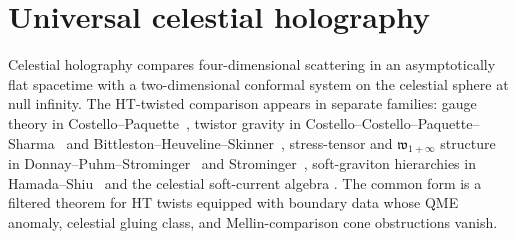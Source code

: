 %
%

\providecommand{\cA}{\mathcal A}
\providecommand{\cB}{\mathcal B}
\providecommand{\cC}{\mathcal C}
\providecommand{\cE}{\mathcal E}
\providecommand{\cF}{\mathcal F}
\providecommand{\cH}{\mathcal H}
\providecommand{\cI}{\mathcal I}
\providecommand{\cL}{\mathcal L}
\providecommand{\cM}{\mathcal M}
\providecommand{\cO}{\mathcal O}
\providecommand{\cP}{\mathcal P}
\providecommand{\cS}{\mathcal S}
\providecommand{\cT}{\mathcal T}
\providecommand{\cW}{\mathcal W}
\providecommand{\RR}{\mathbb R}
\providecommand{\CC}{\mathbb C}
\providecommand{\PP}{\mathbb P}
\providecommand{\ZZ}{\mathbb Z}
\providecommand{\NN}{\mathbb N}
\providecommand{\HH}{\mathbb H}
\providecommand{\scri}{\mathscr I}
\providecommand{\Ran}{\operatorname{Ran}}
\providecommand{\Sym}{\operatorname{Sym}}
\providecommand{\Obs}{\operatorname{Obs}}
\providecommand{\Cone}{\operatorname{Cone}}
\providecommand{\gr}{\operatorname{gr}}
\providecommand{\End}{\operatorname{End}}
\providecommand{\Hom}{\operatorname{Hom}}
\providecommand{\Res}{\operatorname{Res}}
\providecommand{\Mel}{\widetilde}
\providecommand{\SCchtop}{\mathsf{SC}^{\mathrm{ch,top}}}
\providecommand{\Barch}{\mathrm B^{\mathrm{ch}}}
\providecommand{\BarchOrd}{\mathrm B^{\mathrm{ch},\mathrm{ord}}}
\providecommand{\ChirHoch}{\mathrm{ChirHoch}}
\providecommand{\dlog}{\mathrm d\log}
\providecommand{\delbar}{\bar\partial}
\providecommand{\vf}{\boldsymbol\eta}
\providecommand{\wtc}{\mathfrak w_{1+\infty}}
\providecommand{\kap}{\kappaChHodge}

\section{Universal celestial holography}
\label{sec:universal-celestial-holography}

\noindent
Celestial holography compares four-dimensional scattering in an
asymptotically flat spacetime with a two-dimensional conformal system
on the celestial sphere at null infinity. The HT-twisted comparison
appears in separate families: gauge theory in
Costello--Paquette~\cite{CostelloPaquetteTwistedSugraStates,
CostelloPaquetteIIBTwist}, twistor gravity in
Costello--Costello--Paquette--Sharma~\cite{CostelloPaquetteSharmaCelestial}
and Bittleston--Heuveline--Skinner~\cite{BittlestonHeuvelineSkinner},
stress-tensor and $\wtc$ structure in
Donnay--Puhm--Strominger~\cite{DonnayPuhmStrominger18} and
Strominger~\cite{StromingerWInfinityCelestial}, soft-graviton hierarchies
in Hamada--Shiu~\cite{HamadaShiuSubsubSoft} and the celestial
soft-current algebra
\cite{GuevaraHimwichPateStrominger21,StromingerWInfinityCelestial}.
The common form is a
filtered theorem for HT twists equipped with boundary data whose QME
anomaly, celestial gluing class, and Mellin-comparison cone
obstructions vanish.


